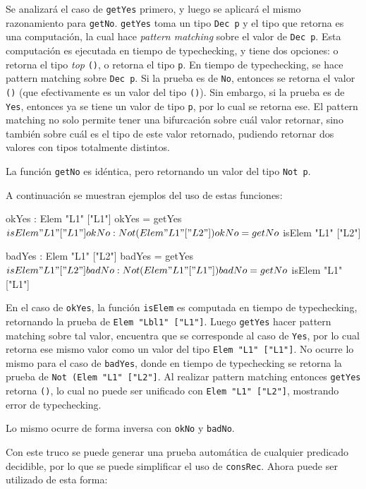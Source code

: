Se analizará el caso de \texttt{getYes} primero, y luego se aplicará el mismo razonamiento para \texttt{getNo}.
\texttt{getYes} toma un tipo \texttt{Dec p} y el tipo que retorna es una computación, la cual hace \textit{pattern matching} sobre el valor de \texttt{Dec p}. Esta computación es ejecutada en tiempo de typechecking, y tiene dos opciones: o retorna el tipo \textit{top} \texttt{()}, o retorna el tipo \texttt{p}.
En tiempo de typechecking, se hace pattern matching sobre \texttt{Dec p}. Si la prueba es de \texttt{No}, entonces se retorna el valor \texttt{()} (que efectivamente es un valor del tipo \texttt{()}). Sin embargo, si la prueba es de \texttt{Yes}, entonces ya se tiene un valor de tipo \texttt{p}, por lo cual se retorna ese. El pattern matching no solo permite tener una bifurcación sobre cuál valor retornar, sino también sobre cuál es el tipo de este valor retornado, pudiendo retornar dos valores con tipos totalmente distintos.

La función \texttt{getNo} es idéntica, pero retornando un valor del tipo \texttt{Not p}.

A continuación se muestran ejemplos del uso de estas funciones:

\begin{code}
okYes : Elem "L1" ["L1"]
okYes = getYes $ isElem "L1" ["L1"]

okNo : Not (Elem "L1" ["L2"])
okNo = getNo $ isElem "L1" ["L2"]

badYes : Elem "L1" ["L2"]
badYes = getYes $ isElem "L1" ["L2"]

badNo : Not (Elem "L1" ["L1"])
badNo = getNo $ isElem "L1" ["L1"]
\end{code}

En el caso de \texttt{okYes}, la función \texttt{isElem} es computada en tiempo de typechecking, retornando la prueba de \texttt{Elem "Lbl1" ["L1"]}. Luego \texttt{getYes} hacer pattern matching sobre tal valor, encuentra que se corresponde al caso de \texttt{Yes}, por lo cual retorna ese mismo valor como un valor del tipo \texttt{Elem "L1" ["L1"]}. No ocurre lo mismo para el caso de \texttt{badYes}, donde en tiempo de typechecking se retorna la prueba de \texttt{Not (Elem "L1" ["L2"]}. Al realizar pattern matching entonces \texttt{getYes} retorna \texttt{()}, lo cual no puede ser unificado con \texttt{Elem "L1" ["L2"]}, mostrando error de typechecking.

Lo mismo ocurre de forma inversa con \texttt{okNo} y \texttt{badNo}.

Con este truco se puede generar una prueba automática de cualquier predicado decidible, por lo que se puede simplificar el uso de \texttt{consRec}.
Ahora puede ser utilizado de esta forma:

